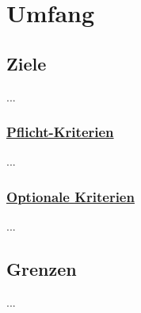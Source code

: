 %
%


\chapter{Umfang}
\label{Umfang}


%
\section{Ziele}

...
\\

% 
%
\subsection{\underline{Pflicht-Kriterien}}

...
\\


\subsection{\underline{Optionale Kriterien}}

...
\\


\section{Grenzen}

...
\\



